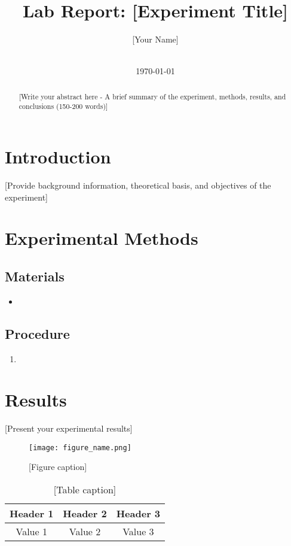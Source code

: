 \documentclass[12pt]{article}
\title{Lab Report: [Experiment Title]}
\author{[Your Name]\\[Course Name]\\[Institution]}
\date{\today}
\begin{document}
\maketitle

\begin{abstract}
[Write your abstract here - A brief summary of the experiment, methods, results, and conclusions (150-200 words)]
\end{abstract}

\section{Introduction}
[Provide background information, theoretical basis, and objectives of the experiment]

\section{Experimental Methods}
\subsection{Materials}
\begin{itemize}
    \item [List materials used]
\end{itemize}

\subsection{Procedure}
\begin{enumerate}
    \item [Detail the experimental steps]
\end{enumerate}

\section{Results}
[Present your experimental results]

\begin{figure}[H]
    \centering
    \texttt{[image: figure\_name.png]}
    \caption{[Figure caption]}
    \label{fig:example}
\end{figure}

\begin{table}[H]
    \centering
    \begin{tabular}{|c|c|c|}
        \hline
        Header 1 & Header 2 & Header 3 \\
        \hline
        Value 1 & Value 2 & Value 3 \\
        \hline
    \end{tabular}
    \caption{[Table caption]}
    \label{tab:example}
\end{table}
\end{document}
